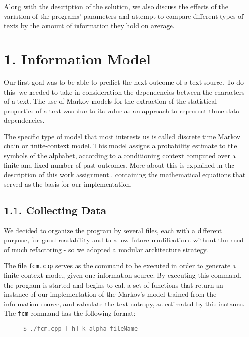 \documentclass[12pt]{article}
\begin{document}
Along with the description of the solution, we also discuss the effects
of the variation of the programs' parameters and attempt to compare 
different types of texts by the amount of information they hold on average.
\newpage

\section*{1. Information Model}

Our first goal was to be able to predict the next outcome of a text source.
To do this, we needed to take in consideration the dependencies between 
the characters of a text.
The use of Markov models for the extraction of the statistical properties of a
text was due to its value as an approach to represent these data dependencies.

The specific type of model that most interests us is called discrete time
Markov chain or finite-context model.
This model assigns a probability estimate to the symbols of the alphabet, 
according to a conditioning context computed over a finite and fixed number
of past outcomes. 
More about this is explained in the description of this work assignment 
\cite{trab1}, containing the mathematical equations that served as the basis 
for our implementation.

\subsection*{1.1. Collecting Data}

We decided to organize the program by several files, each with a different
purpose, for good readability and to allow future modifications without the 
need of much refactoring - so we adopted a modular architecture strategy.

The file \texttt{fcm.cpp} serves as the command to be executed in order to 
generate a finite-context model, given one information source.
By executing this command, the program is started and begins to
call a set of functions that return an instance of our 
implementation of the Markov's model trained from the information source, 
and calculate the text entropy, as estimated by this instance.
The \texttt{fcm} command has the following format:

\begin{quote}
\begin{verbatim}
$ ./fcm.cpp [-h] k alpha fileName 
\end{verbatim}
\end{quote}
\end{document}
